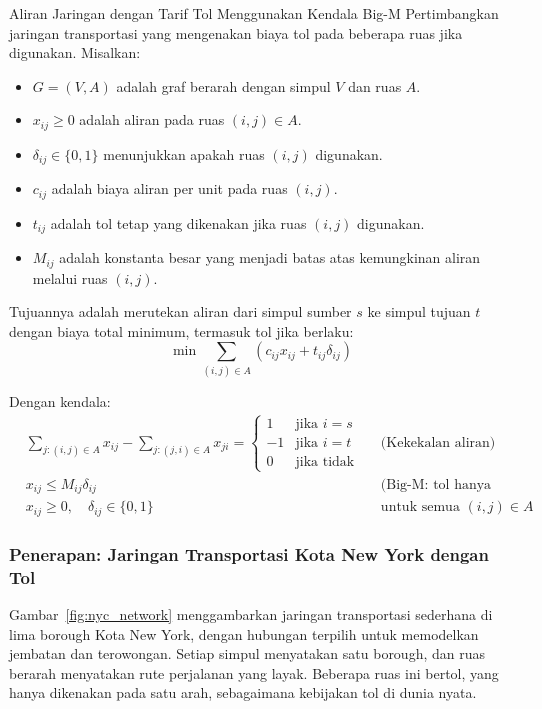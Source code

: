\begin{example}{Aliran Jaringan dengan Tarif Tol Menggunakan Kendala Big-M}{}
Pertimbangkan jaringan transportasi yang mengenakan biaya tol pada beberapa ruas jika digunakan. Misalkan:
\begin{itemize}
  \item \( G = (V, A) \) adalah graf berarah dengan simpul \(V\) dan ruas \(A\).
  \item \( x_{ij} \geq 0 \) adalah aliran pada ruas \((i,j) \in A\).
  \item \( \delta_{ij} \in \{0,1\} \) menunjukkan apakah ruas \((i,j)\) digunakan.
  \item \( c_{ij} \) adalah biaya aliran per unit pada ruas \((i,j)\).
  \item \( t_{ij} \) adalah tol tetap yang dikenakan jika ruas \((i,j)\) digunakan.
  \item \( M_{ij} \) adalah konstanta besar yang menjadi batas atas kemungkinan aliran melalui ruas \((i,j)\).
\end{itemize}

Tujuannya adalah merutekan aliran dari simpul sumber \(s\) ke simpul tujuan \(t\) dengan biaya total minimum, termasuk tol jika berlaku:
\[
\min \sum_{(i,j) \in A} \left( c_{ij} x_{ij} + t_{ij} \delta_{ij} \right)
\]

\noindent Dengan kendala:
\begin{align*}
  &\sum_{j: (i,j) \in A} x_{ij} - \sum_{j: (j,i) \in A} x_{ji} =
  \begin{cases}
    1 & \text{jika } i = s \\
    -1 & \text{jika } i = t \\
    0 & \text{jika tidak}
  \end{cases} &&\text{(Kekekalan aliran)} \\
  &x_{ij} \le M_{ij} \delta_{ij} &&\text{(Big-M: tol hanya berlaku jika ruas digunakan)} \\
  &x_{ij} \ge 0, \quad \delta_{ij} \in \{0,1\} &&\text{untuk semua } (i,j) \in A
\end{align*}

\end{example}

\subsubsection{Penerapan: Jaringan Transportasi Kota New York dengan Tol}

Gambar~\ref{fig:nyc_network} menggambarkan jaringan transportasi sederhana di lima borough Kota New York, dengan hubungan terpilih untuk memodelkan jembatan dan terowongan. Setiap simpul menyatakan satu borough, dan ruas berarah menyatakan rute perjalanan yang layak. Beberapa ruas ini bertol, yang hanya dikenakan pada satu arah, sebagaimana kebijakan tol di dunia nyata.

